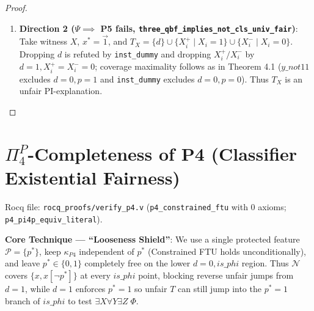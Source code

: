 \documentclass[11pt,a4paper]{article}
\newcommand{\N}{\mathcal{N}}
\newcommand{\Prot}{\mathcal{P}}
\newcommand{\cov}{\operatorname{cov}}
\newcommand{\code}[1]{\texttt{\small #1}}
\begin{document}
\begin{proof}
\begin{enumerate}
\begin{itemize}
    \item \textbf{Case 4 ($d(x)=0, p(x)=1$, \code{neg\_three\_qbf\_case\_d0\_p1})}: (a) If $T$ contains a $0$-valued $Y_j^+/Y_j^-$, drop $d$; (b) if $\kappa(x)=1$, $T$ fixes one $1$-rail in every pair $(X_i^+, X_i^-)$, so dropping $d$ still guarantees $x\_ok=1$ on $d=1$; (c) if $\kappa(x)=0$: if $T$ contains some $Y_{j_0}^+$ or $Y_{j_0}^-$ (value $1$, dual rail $0$), set
    \[
      S = (T \setminus (\{d\} \cup \{Y_j^+,Y_j^-\})) \cup \{p\} \cup \{Y_j^- \mid Y_j^+ \in T\} \cup \{Y_j^+ \mid Y_j^- \in T\}.
    \]
    Using \code{dummy\_body} (excludes $p=0$) and $y\_not11$ gives $\cov_T(x) \subseteq \cov_S(x)$; every point in $\cov_S(x)$ either lies in $\cov_T(x)$ or hits $(0,0)$ ($\kappa=0$ in both cases), and setting $(Y_{j_0}^+,Y_{j_0}^-)=(0,0)$ proves strict subsumption. If $T$ contains no $Y_j^+/Y_j^-$, either some $X_{i_0}^+, X_{i_0}^- \in T$ with $X_{i_0}^+(x)=X_{i_0}^-(x)=0$ ($\{X_{i_0}^+,X_{i_0}^-\} \subsetneq T$ contradicts minimality), or $\neg\Psi$ constructs $w_{(X,Y^*,Z(x))} \in \cov_T(x)$ ($\kappa=1$), contradiction.
  \end{itemize}
  \item \textbf{Direction 2 ($\Psi \implies$ P5 fails, \code{three\_qbf\_implies\_not\_cls\_univ\_fair})}: Take witness $X$, $x^*=\vec{1}$, and $T_X = \{d\} \cup \{X_i^+ \mid X_i=1\} \cup \{X_i^- \mid X_i=0\}$. Dropping $d$ is refuted by \code{inst\_dummy} and dropping $X_i^+/X_i^-$ by $d=1, X_i^+=X_i^-=0$; coverage maximality follows as in Theorem 4.1 ($y\_not11$ excludes $d=0,p=1$ and \code{inst\_dummy} excludes $d=0,p=0$). Thus $T_X$ is an unfair PI-explanation.
\end{enumerate}
\end{proof}

\section{\texorpdfstring{$\Pi_4^P$}{Pi\_4\^{}P}-Completeness of P4 (Classifier Existential Fairness)}
Rocq file: \code{rocq\_proofs/verify\_p4.v} (\code{p4\_constrained\_ftu} with 0 axioms; \code{p4\_pi4p\_equiv\_literal}).

\textbf{Core Technique — ``Looseness Shield''}: We use a single protected feature $\Prot = \{p^*\}$, keep $\kappa_{P4}$ independent of $p^*$ (Constrained FTU holds unconditionally), and leave $p^* \in \{0,1\}$ completely free on the lower $d=0, is\_phi$ region. Thus $\N$ covers $\{x, x[\neg p^*]\}$ at every $is\_phi$ point, blocking reverse unfair jumps from $d=1$, while $d=1$ enforces $p^*=1$ so unfair $T$ can still jump into the $p^*=1$ branch of $is\_phi$ to test $\exists X\forall Y\exists Z\;\Phi$.
\end{document}
